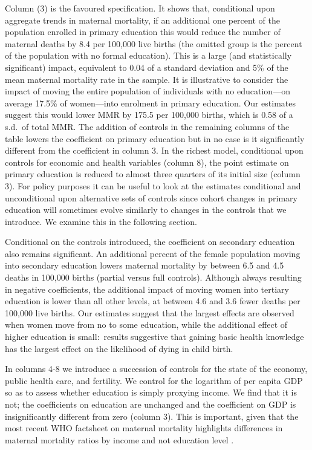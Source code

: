 \documentclass{article}[12pt,subeqn]
\begin{document}
\begin{spacing}{1.4}
Column (3) is the favoured specification. It shows that, conditional upon 
aggregate trends in maternal mortality, if an additional one percent of the 
population enrolled in primary education this would reduce the number of maternal 
deaths by 8.4 per 100,000 live births (the omitted group is the percent of the
population with no formal education).  This is a large (and statistically
significant) impact, equivalent to 0.04 of a standard deviation and 5\% of the
mean maternal mortality rate in the sample. It is illustrative to consider the
impact of moving the entire population of individuals with no education---on
average 17.5\% of women---into enrolment in primary education. Our estimates
suggest this would lower MMR by 175.5 per 100,000 births, which is 0.58 of a
s.d.\ of total MMR. The addition of controls in the remaining columns of the
table lowers the coefficient on primary education but in no case is it
significantly different from the coefficient in column 3. In the richest model,
conditional upon controls for economic and health variables (column 8), the
point estimate on primary education is reduced to almost three quarters of its 
initial size (column 3). For policy purposes it can be useful to look at the 
estimates conditional and unconditional upon alternative sets of controls since 
cohort changes in primary education will sometimes evolve similarly to changes in 
the controls that we introduce. We examine this in the following section.

Conditional on the controls introduced, the coefficient on secondary education
also remains significant. An additional percent of the female population moving
into secondary education lowers maternal mortality by between 6.5 and 4.5 deaths
in 100,000 births (partial versus full controls).  Although always resulting
in negative coefficients, the additional impact of moving women into tertiary
education is lower than all other levels, at between 4.6 and 3.6 fewer deaths per
100,000 live births.  Our estimates suggest that the largest effects are observed
when women move from no to some education, while
the additional effect of higher education is small:\ results suggestive that
gaining basic health knowledge has the largest effect on the likelihood of dying
in child birth.

In columns 4-8 we introduce a succession of controls for the state of the
economy, public health care, and fertility. We control for the logarithm of per 
capita GDP so as to assess whether education is simply proxying income. We find 
that it is not; the coefficients on education are unchanged and the coefficient 
on GDP is insignificantly different from zero (column 3). This is important, 
given that the most recent WHO factsheet on maternal mortality highlights 
differences in maternal mortality ratios by income and not education level
\citep{WHO2012}.


\end{spacing}
\end{document}
